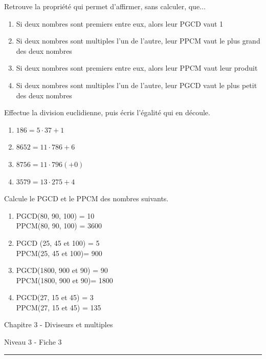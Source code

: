 \documentclass[12pt,parskip=half-, twoside=semi]{scrartcl}
\begin{document}
\setcounter{exercise}{0}
      
\begin{exercise}
  Retrouve la propriété qui permet d'affirmer, sans calculer, que... 
  \begin{enumerate}
    \item Si deux nombres sont premiers entre eux, alors leur PGCD vaut 1
    \item Si deux nombres sont multiples l'un de l'autre, leur PPCM vaut le plus grand des deux nombres
    \item Si deux nombres sont premiers entre eux, alors leur PPCM vaut leur produit
    \item Si deux nombres sont multiples l'un de l'autre, leur PGCD vaut le plus petit des deux nombres
  \end{enumerate}
\end{exercise}

\begin{exercise}
  Effectue la division euclidienne, puis écris l'égalité qui en découle. 
    \begin{enumerate}[cols=2]
      \item \(186=5\cdot37 +1\)
      \item \(8652 = 11 \cdot 786 +6\)
      \item \(8756=11 \cdot 796 (+0)\)
      \item \(3579 = 13 \cdot 275 + 4\)
    \end{enumerate}
\end{exercise}

\begin{exercise}
  Calcule le PGCD et le PPCM des nombres suivants. 
    \begin{enumerate}[cols=2]
      \item  PGCD(80, 90, 100) = 10 \\ PPCM(80, 90, 100) = 3600 
      \item PGCD (25, 45 et 100) = 5 \\ PPCM(25, 45 et 100)= 900
      \item PGCD(1800, 900 et 90) = 90 \\ PPCM(1800, 900 et 90)= 1800
      \item PGCD(27, 15 et 45) = 3 \\ PPCM(27, 15 et 45) = 135
    \end{enumerate}
\end{exercise}

\newpage

\begin{center}
  \bfseries
  \begin{Huge}
    Chapitre 3 - Diviseurs et multiples
  \end{Huge}
  \smallbreak
  \begin{large}
    Niveau 3    - Fiche 3
  \end{large}
  \smallbreak
  \rule[10pt]{.5\linewidth}{1 pt}
\end{center}
\end{document}
